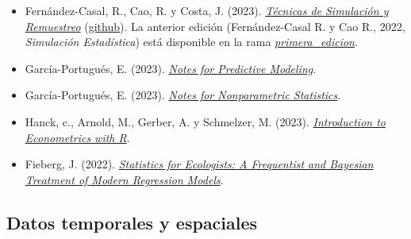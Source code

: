 \documentclass[
]{book}
\theoremstyle{break}
\theoremstyle{nonumberplain}
\begin{document}
\begin{itemize}
\item
  Fernández-Casal, R., Cao, R. y Costa, J. (2023). \emph{\href{https://rubenfcasal.github.io/simbook}{Técnicas de Simulación y Remuestreo}} (\href{https://github.com/rubenfcasal/simbook}{github}). La anterior edición (Fernández-Casal R. y Cao R., 2022, \emph{Simulación Estadística}) está disponible en la rama \emph{\href{https://github.com/rubenfcasal/simbook/tree/primera_edicion}{primera\_edicion}}.
\item
  García-Portugués, E. (2023). \emph{\href{https://bookdown.org/egarpor/PM-UC3M/}{Notes for Predictive Modeling}}.
\item
  García-Portugués, E. (2023). \emph{\href{https://bookdown.org/egarpor/NP-UC3M/}{Notes for Nonparametric Statistics}}.
\item
  Hanck, c., Arnold, M., Gerber, A. y Schmelzer, M. (2023). \emph{\href{https://www.econometrics-with-r.org/}{Introduction to Econometrics with R}}.
\item
  Fieberg, J. (2022). \emph{\href{https://fw8051statistics4ecologists.netlify.app/}{Statistics for Ecologists: A Frequentist and Bayesian Treatment of Modern Regression Models}}.
\end{itemize}

\hypertarget{datos-temporales-y-espaciales}{%
\subsection*{Datos temporales y espaciales}\label{datos-temporales-y-espaciales}}
\end{document}
